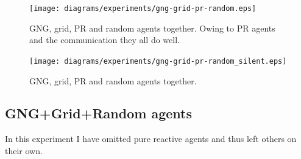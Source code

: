 

\begin{figure}[h!]
  \centering                                
  \texttt{[image: diagrams/experiments/gng-grid-pr-random.eps]}    
  \caption{GNG, grid, PR and random agents together. Owing to PR agents and the communication they all do well.}
  \label{experiments:gng-grid-pr-random}
\end{figure}

\begin{figure}[h!]
  \centering                                
  \texttt{[image: diagrams/experiments/gng-grid-pr-random\_silent.eps]}    
  \caption{GNG, grid, PR and random agents together.}
  \label{experiments:gng-grid-pr-random-silent}
\end{figure}
                                       
\subsection{GNG+Grid+Random agents}

In this experiment I have omitted pure reactive agents and thus left others on their own.           
             
